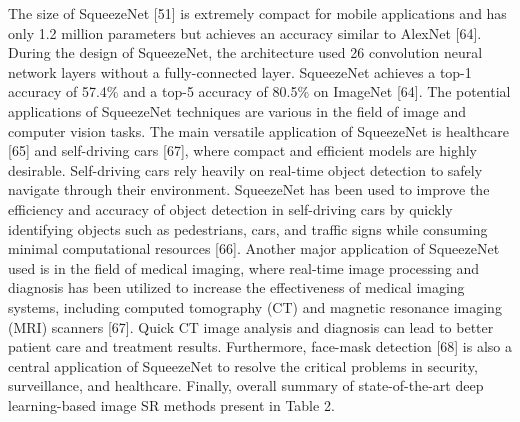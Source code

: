 \documentclass{ieeeaccess}
\begin{document}
The size of SqueezeNet [51] is extremely compact for mobile applications and has only 1.2 million parameters but achieves an accuracy similar to AlexNet [64]. During the design of SqueezeNet, the architecture used 26 convolution neural network layers without a fully-connected layer. SqueezeNet achieves a top-1 accuracy of 57.4\% and a top-5 accuracy of 80.5\% on ImageNet [64]. The potential applications of SqueezeNet   techniques are various in the field of image and computer vision tasks. The main versatile application of SqueezeNet is healthcare [65] and self-driving cars [67], where compact and efficient models are highly desirable. Self-driving cars rely heavily on real-time object detection to safely navigate through their environment. SqueezeNet has been used to improve the efficiency and accuracy of object detection in self-driving cars by quickly identifying objects such as pedestrians, cars, and traffic signs while consuming minimal computational resources [66]. Another major application of SqueezeNet used is in the field of medical imaging, where real-time image processing and diagnosis has been utilized to increase the effectiveness of medical imaging systems, including computed tomography (CT) and magnetic resonance imaging (MRI) scanners [67]. Quick CT image analysis and diagnosis can lead to better patient care and treatment results. Furthermore, face-mask detection [68] is also a central application of SqueezeNet to resolve the critical problems in security, surveillance, and healthcare. Finally, overall summary of state-of-the-art deep learning-based image SR methods present in Table 2.
\end{document}
